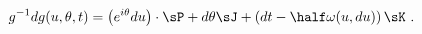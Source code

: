 \begin{equation}
  \label{eq:MCL}
  g^{-1}dg(u,\theta,t) = \left(e^{i\theta} du \right) \cdot \sP +
  d\theta \sJ + \left( dt - \half \omega(u,du) \right) \sK~.
\end{equation}

